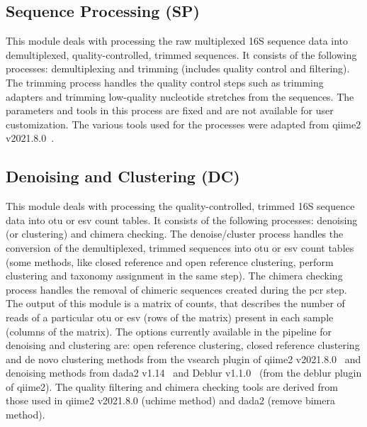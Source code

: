   \subsection*{Sequence Processing (SP)}
  This module deals with processing the raw multiplexed 16S sequence data into demultiplexed, quality-controlled, trimmed sequences.
  It consists of the following processes: demultiplexing and trimming (includes quality control and filtering).
  The trimming process handles the quality control steps such as trimming adapters and trimming low-quality nucleotide stretches from the sequences.
  The parameters and tools in this process are fixed and are not available for user customization.
  The various tools used for the processes were adapted from \ac{qiime2} v2021.8.0~\cite{bolyenReproducibleInteractiveScalable2019}.

  \subsection*{Denoising and Clustering (DC)}
  \vspace{-5mm}
  This module deals with processing the quality-controlled, trimmed 16S sequence data into \ac{otu} or \ac{esv} count tables.
  It consists of the following processes: denoising (or clustering) and chimera checking.
  The denoise/cluster process handles the conversion of the demultiplexed, trimmed sequences into \ac{otu} or \ac{esv} count tables (some methods, like closed reference and open reference clustering, perform clustering and taxonomy assignment in the same step).
  The chimera checking process handles the removal of chimeric sequences created during the \ac{pcr} step.
  The output of this module is a matrix of counts, that describes the number of reads of a particular \ac{otu} or \ac{esv} (rows of the matrix) present in each sample (columns of the matrix).
  The options currently available in the pipeline for denoising and clustering are: open reference clustering, closed reference clustering and de novo clustering methods from the vsearch plugin of \ac{qiime2} v2021.8.0~\cite{bolyenReproducibleInteractiveScalable2019} and denoising methods from \ac{dada2} v1.14~\cite{Callahan2016} and Deblur v1.1.0~\cite{Amir2017} (from the deblur plugin of \ac{qiime2}).
  The quality filtering and chimera checking tools are derived from those used in \ac{qiime2} v2021.8.0 (uchime method) and \ac{dada2} (remove bimera method).

